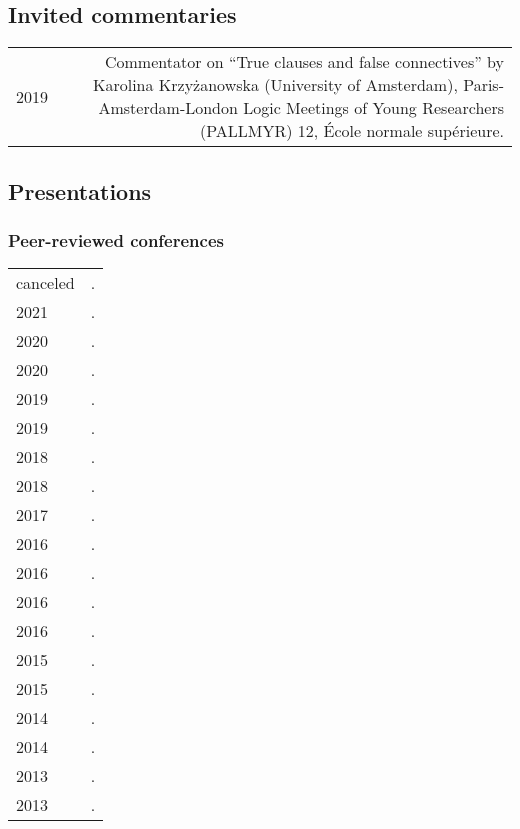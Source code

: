 \documentclass[12pt,letterpaper,twoside]{article}
\makeatletter
\newenvironment{cvsection}{%
  \begin{longtable}[l]{@{}L@{} @{}R@{}}
}{%
  \end{longtable}
}
\makeatother
\begin{document}
\subsection*{Invited commentaries}

\begin{cvsection}
  2019 & Commentator on ``True clauses and false connectives'' by Karolina Krzyżanowska (University of Amsterdam), Paris-Amsterdam-London Logic Meetings of Young Researchers (PALLMYR) 12, École normale supérieure.\\
\end{cvsection}

\clearpage

\subsection*{Presentations}

\subsubsection*{Peer-reviewed conferences}

\begin{cvsection}
  canceled & .\\
  2021 & .\\
  2020 & .\\
  2020 & .\\
  2019 & .\\
  2019 & .\\
  2018 & .\\
  2018 & .\\
  2017 & .\\
  2016 & .\\
  2016 & .\\
  2016 & .\\
  2016 & .\\
  2015 & .\\
  2015 & .\\
  2014 & .\\
  2014 & .\\
  2013 & .\\
  2013 & .\\
\end{cvsection}
\end{document}
